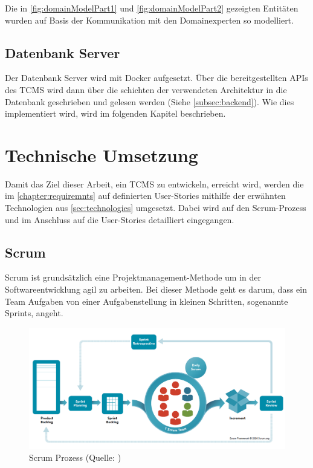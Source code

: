 \documentclass[a4paper, fontsize=11pt, parskip=half, twoside]{scrreprt}
\begin{document}
	Die in \autoref{fig:domainModelPart1} und \autoref{fig:domainModelPart2} gezeigten Entitäten wurden auf Basis der Kommunikation mit den Domainexperten so modelliert.
	
	\section{Datenbank Server}
	Der Datenbank Server wird mit Docker aufgesetzt.
	Über die bereitgestellten \ac{API}s des \ac{TCMS} wird dann über die schichten der verwendeten Architektur in die Datenbank geschrieben und gelesen werden (Siehe \autoref{subsec:backend}).
	Wie dies implementiert wird, wird im folgenden Kapitel beschrieben.
	
	
	\chapter{Technische Umsetzung}
	Damit das Ziel dieser Arbeit, ein \ac{TCMS} zu entwickeln, erreicht wird, werden die im \autoref{chapter:requiremnts} auf  definierten User-Stories mithilfe der erwähnten Technologien aus \autoref{sec:technologies} umgesetzt.
	Dabei wird auf den Scrum-Prozess und im Anschluss auf die User-Stories detailliert eingegangen.

	\section{Scrum}
	Scrum ist grundsätzlich eine Projektmanagement-Methode um in der Softwareentwicklung agil zu arbeiten.
	Bei dieser Methode geht es darum, dass ein Team Aufgaben von einer Aufgabenstellung in kleinen Schritten, sogenannte Sprints, angeht.
	
	\textcite{rubin_essential_2012}
	
	\begin{figure}[ht]
		\centering
		\includegraphics[scale=0.4]{assets/scrum-process.png}
		\caption{Scrum Prozess (Quelle: \textcite{noauthor_home_nodate})}
		\label{fig:scrum-process}
	\end{figure}
	
\end{document}
